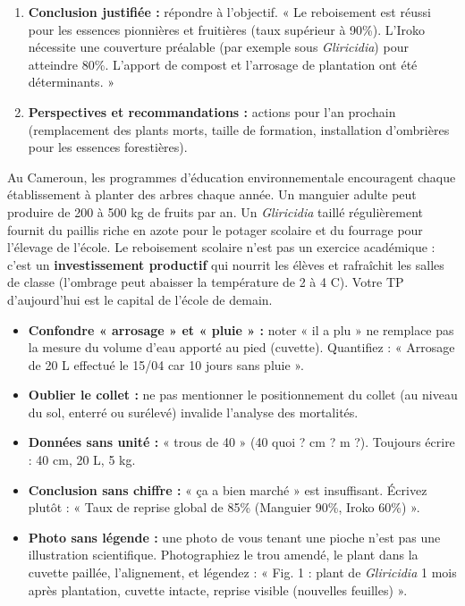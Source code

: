 \documentclass[11pt]{article}
\begin{document}
\begin{methode}
\begin{enumerate}
    \item \textbf{Conclusion justifiée :} répondre à l'objectif. « Le reboisement est réussi pour les essences pionnières et fruitières (taux supérieur à 90\%). L'Iroko nécessite une couverture préalable (par exemple sous \textit{Gliricidia}) pour atteindre 80\%. L'apport de compost et l'arrosage de plantation ont été déterminants. »
    \item \textbf{Perspectives et recommandations :} actions pour l'an prochain (remplacement des plants morts, taille de formation, installation d'ombrières pour les essences forestières).
\end{enumerate}
\end{methode}

\begin{savaistu}
Au Cameroun, les programmes d'éducation environnementale encouragent chaque établissement à planter des arbres chaque année. Un manguier adulte peut produire de 200 à 500 kg de fruits par an. Un \textit{Gliricidia} taillé régulièrement fournit du paillis riche en azote pour le potager scolaire et du fourrage pour l'élevage de l'école. Le reboisement scolaire n'est pas un exercice académique : c'est un \textbf{investissement productif} qui nourrit les élèves et rafraîchit les salles de classe (l'ombrage peut abaisser la température de 2 à 4 \degres C). Votre TP d'aujourd'hui est le capital de l'école de demain.
\end{savaistu}

\begin{attention}
\begin{itemize}
    \item \textbf{Confondre « arrosage » et « pluie » :} noter « il a plu » ne remplace pas la mesure du volume d'eau apporté au pied (cuvette). Quantifiez : « Arrosage de 20 L effectué le 15/04 car 10 jours sans pluie ».
    \item \textbf{Oublier le collet :} ne pas mentionner le positionnement du collet (au niveau du sol, enterré ou surélevé) invalide l'analyse des mortalités.
    \item \textbf{Données sans unité :} « trous de 40 » (40 quoi ? cm ? m ?). Toujours écrire : 40 cm, 20 L, 5 kg.
    \item \textbf{Conclusion sans chiffre :} « ça a bien marché » est insuffisant. Écrivez plutôt : « Taux de reprise global de 85\% (Manguier 90\%, Iroko 60\%) ».
    \item \textbf{Photo sans légende :} une photo de vous tenant une pioche n'est pas une illustration scientifique. Photographiez le trou amendé, le plant dans la cuvette paillée, l'alignement, et légendez : « Fig. 1 : plant de \textit{Gliricidia} 1 mois après plantation, cuvette intacte, reprise visible (nouvelles feuilles) ».
\end{itemize}
\end{attention}
\end{document}
